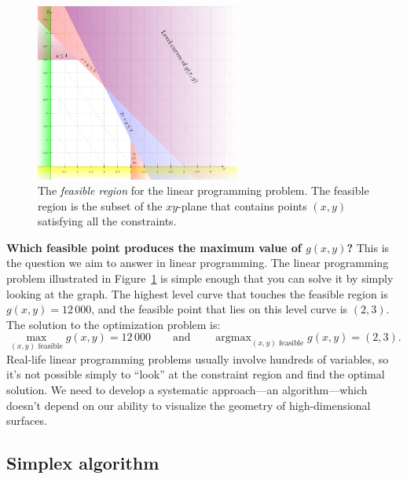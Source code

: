 \documentclass[11pt,oneside]{article}
\begin{document}
	
		\begin{figure}[htb]
		\begin{center}
		\includegraphics[width=0.6\textwidth]{figures/linear_algebra/linear_programming_feasible_region.pdf}
		\end{center}
		\vspace{-6mm}
		\caption{The \emph{feasible region} for the linear programming problem. 
				The feasible region is the subset of the $xy$-plane that contains points $(x,y)$ satisfying all the constraints.
				}
		\label{fig:linear_programming_feasible_region}
		\end{figure}

	\noindent
	\textbf{Which feasible point produces the maximum value of $g(x,y)$?}
	This is the question we aim to answer in linear programming.
	The linear programming problem illustrated in Figure~\ref{fig:linear_programming_feasible_region} is
	simple enough that you can solve it by simply looking at the graph.
	The highest level curve that touches the feasible region is $g(x,y)=12\,000$,
	and the feasible point that lies on this level curve is $(2,3)$.
	The solution to the optimization problem is:
	\[
		\max_{(x,y) \textrm{ feasible}} g(x,y) = 12\,000
		\qquad
		\textrm{and}
		\qquad
		\mathop{\textrm{argmax}}_{(x,y) \textrm{ feasible}} g(x,y) = (2,3).
	\]
	Real-life linear programming problems usually involve hundreds of variables,
	so it's not possible simply to ``look'' at the constraint region and find the optimal solution.
	We need to develop a systematic approach---an algorithm---which doesn't
	depend on our ability to visualize the geometry of high-dimensional surfaces.
		
	
\subsection{Simplex algorithm}
\label{applications:simplex_algorithm}
	
\end{document}
